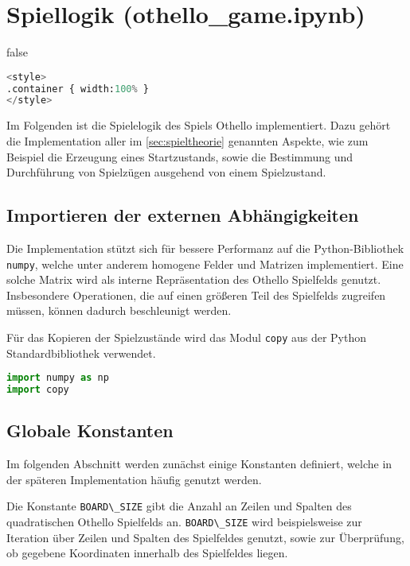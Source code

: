 \hypertarget{spiellogik-othello_game.ipynb}{%
\section{Spiellogik
(othello\_game.ipynb)}\label{spiellogik-othello_game.ipynb}}

\label{sec:gamelogic} \ifx false

\begin{lstlisting}[language=Python]
%%HTML
<style>
.container { width:100% }
</style>
\end{lstlisting}

\fi Im Folgenden ist die Spielelogik des Spiels Othello implementiert.
Dazu gehört die Implementation aller im \autoref{sec:spieltheorie}
genannten Aspekte, wie zum Beispiel die Erzeugung eines Startzustands,
sowie die Bestimmung und Durchführung von Spielzügen ausgehend von einem
Spielzustand.

\hypertarget{importieren-der-externen-abhuxe4ngigkeiten}{%
\subsection{Importieren der externen
Abhängigkeiten}\label{importieren-der-externen-abhuxe4ngigkeiten}}

Die Implementation stützt sich für bessere Performanz auf die
Python-Bibliothek \passthrough{\lstinline!numpy!}, welche unter anderem
homogene Felder und Matrizen implementiert. Eine solche Matrix wird als
interne Repräsentation des Othello Spielfelds genutzt. Insbesondere
Operationen, die auf einen größeren Teil des Spielfelds zugreifen
müssen, können dadurch beschleunigt werden.

Für das Kopieren der Spielzustände wird das Modul
\passthrough{\lstinline!copy!} aus der Python Standardbibliothek
verwendet.

\begin{lstlisting}[language=Python]
import numpy as np
import copy
\end{lstlisting}

\hypertarget{globale-konstanten}{%
\subsection{Globale Konstanten}\label{globale-konstanten}}

Im folgenden Abschnitt werden zunächst einige Konstanten definiert,
welche in der späteren Implementation häufig genutzt werden.

Die Konstante \passthrough{\lstinline!BOARD\_SIZE!} gibt die Anzahl an
Zeilen und Spalten des quadratischen Othello Spielfelds an.
\passthrough{\lstinline!BOARD\_SIZE!} wird beispielsweise zur Iteration
über Zeilen und Spalten des Spielfeldes genutzt, sowie zur Überprüfung,
ob gegebene Koordinaten innerhalb des Spielfeldes liegen.

